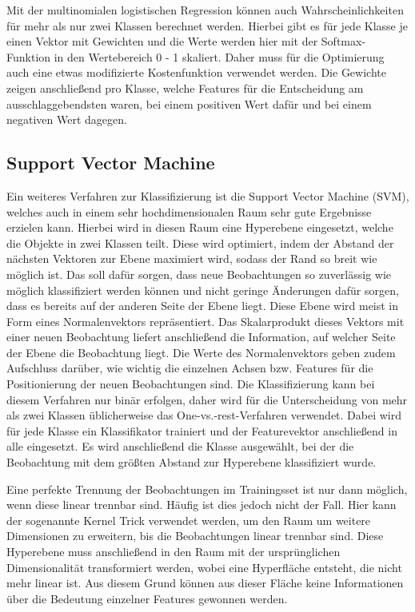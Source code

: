 Mit der multinomialen logistischen Regression können auch Wahrscheinlichkeiten für mehr als nur zwei Klassen berechnet werden. Hierbei gibt es für jede Klasse je einen Vektor mit Gewichten und die Werte werden hier mit der Softmax-Funktion in den Wertebereich 0 - 1 skaliert. Daher muss für die Optimierung auch eine etwas modifizierte Kostenfunktion verwendet werden. Die Gewichte zeigen anschließend pro Klasse, welche Features für die Entscheidung am ausschlaggebendsten waren, bei einem positiven Wert dafür und bei einem negativen Wert dagegen.

\subsection{Support Vector Machine}
Ein weiteres Verfahren zur Klassifizierung ist die Support Vector Machine (SVM), welches auch in einem sehr hochdimensionalen Raum sehr gute Ergebnisse erzielen kann. Hierbei wird in diesen Raum eine Hyperebene eingesetzt, welche die Objekte in zwei Klassen teilt. Diese wird optimiert, indem der Abstand der nächsten Vektoren zur Ebene maximiert wird, sodass der Rand so breit wie möglich ist. Das soll dafür sorgen, dass neue Beobachtungen so zuverlässig wie möglich klassifiziert werden können und nicht geringe Änderungen dafür sorgen, dass es bereits auf der anderen Seite der Ebene liegt. Diese Ebene wird meist in Form eines Normalenvektors repräsentiert. Das Skalarprodukt dieses Vektors mit einer neuen Beobachtung liefert anschließend die Information, auf welcher Seite der Ebene die Beobachtung liegt. Die Werte des Normalenvektors geben zudem Aufschluss darüber, wie wichtig die einzelnen Achsen bzw. Features für die Positionierung der neuen Beobachtungen sind. Die Klassifizierung kann bei diesem Verfahren nur binär erfolgen, daher wird für die Unterscheidung von mehr als zwei Klassen üblicherweise das One-vs.-rest-Verfahren verwendet. Dabei wird für jede Klasse ein Klassifikator trainiert und der Featurevektor anschließend in alle eingesetzt. Es wird anschließend die Klasse ausgewählt, bei der die Beobachtung mit dem größten Abstand zur Hyperebene klassifiziert wurde.

Eine perfekte Trennung der Beobachtungen im Trainingsset ist nur dann möglich, wenn diese linear trennbar sind. Häufig ist dies jedoch nicht der Fall. Hier kann der sogenannte Kernel Trick verwendet werden, um den Raum um weitere Dimensionen zu erweitern, bis die Beobachtungen linear trennbar sind. Diese Hyperebene muss anschließend in den Raum mit der ursprünglichen Dimensionalität transformiert werden, wobei eine Hyperfläche entsteht, die nicht mehr linear ist. Aus diesem Grund können aus dieser Fläche keine Informationen über die Bedeutung einzelner Features gewonnen werden.

